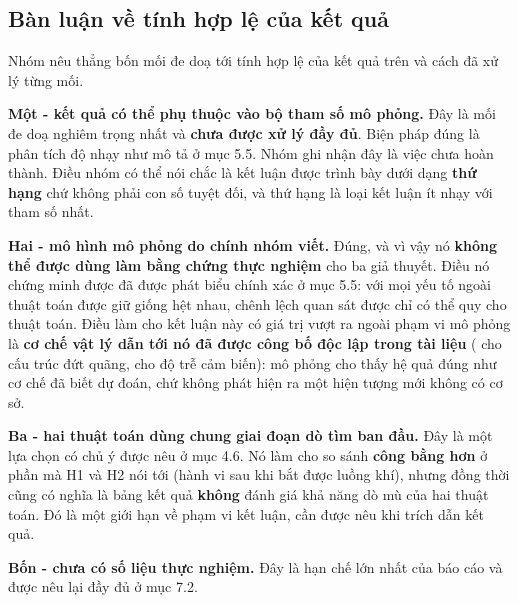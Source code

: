 \subsection{Bàn luận về tính hợp lệ của kết quả}
Nhóm nêu thẳng bốn mối đe doạ tới tính hợp lệ của kết quả trên và cách đã xử lý từng mối.

\textbf{Một - kết quả có thể phụ thuộc vào bộ tham số mô phỏng.} Đây là mối đe doạ nghiêm trọng nhất và \textbf{chưa được xử lý đầy đủ}. Biện pháp đúng là phân tích độ nhạy như mô tả ở mục 5.5. Nhóm ghi nhận đây là việc chưa hoàn thành. Điều nhóm có thể nói chắc là kết luận được trình bày dưới dạng \textbf{thứ hạng} chứ không phải con số tuyệt đối, và thứ hạng là loại kết luận ít nhạy với tham số nhất.

\textbf{Hai - mô hình mô phỏng do chính nhóm viết.} Đúng, và vì vậy nó \textbf{không thể được dùng làm bằng chứng thực nghiệm} cho ba giả thuyết. Điều nó chứng minh được đã được phát biểu chính xác ở mục 5.5: với mọi yếu tố ngoài thuật toán được giữ giống hệt nhau, chênh lệch quan sát được chỉ có thể quy cho thuật toán. Điều làm cho kết luận này có giá trị vượt ra ngoài phạm vi mô phỏng là \textbf{cơ chế vật lý dẫn tới nó đã được công bố độc lập trong tài liệu} (\cite{r1} cho cấu trúc đứt quãng, \cite{r3} cho độ trễ cảm biến): mô phỏng cho thấy hệ quả đúng như cơ chế đã biết dự đoán, chứ không phát hiện ra một hiện tượng mới không có cơ sở.

\textbf{Ba - hai thuật toán dùng chung giai đoạn dò tìm ban đầu.} Đây là một lựa chọn có chủ ý được nêu ở mục 4.6. Nó làm cho so sánh \textbf{công bằng hơn} ở phần mà H1 và H2 nói tới (hành vi sau khi bắt được luồng khí), nhưng đồng thời cũng có nghĩa là bảng kết quả \textbf{không} đánh giá khả năng dò mù của hai thuật toán. Đó là một giới hạn về phạm vi kết luận, cần được nêu khi trích dẫn kết quả.

\textbf{Bốn - chưa có số liệu thực nghiệm.} Đây là hạn chế lớn nhất của báo cáo và được nêu lại đầy đủ ở mục 7.2.
